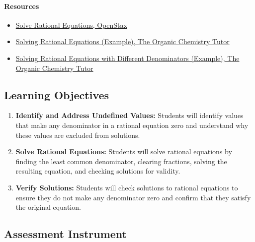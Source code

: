 \paragraph{Resources}

\begin{itemize}
    \item \href{https://openstax.org/books/intermediate-algebra-2e/pages/7-4-solve-rational-equations}{Solve Rational Equations, OpenStax}
    \item \href{https://www.youtube.com/watch?v=1fR_9ke5-n8}{Solving Rational Equations (Example), The Organic Chemistry Tutor}
    \item \href{https://www.youtube.com/watch?v=MFjx52NW5Bw}{Solving Rational Equations with Different Denominators (Example), The Organic Chemistry Tutor}
\end{itemize}

\subsection{Learning Objectives}

\begin{enumerate}
    \item \textbf{Identify and Address Undefined Values:} Students will identify values that make any denominator in a rational equation zero and understand why these values are excluded from solutions.
    \item \textbf{Solve Rational Equations:} Students will solve rational equations by finding the least common denominator, clearing fractions, solving the resulting equation, and checking solutions for validity.
    \item \textbf{Verify Solutions:} Students will check solutions to rational equations to ensure they do not make any denominator zero and confirm that they satisfy the original equation.
\end{enumerate}

\subsection{Assessment Instrument}

